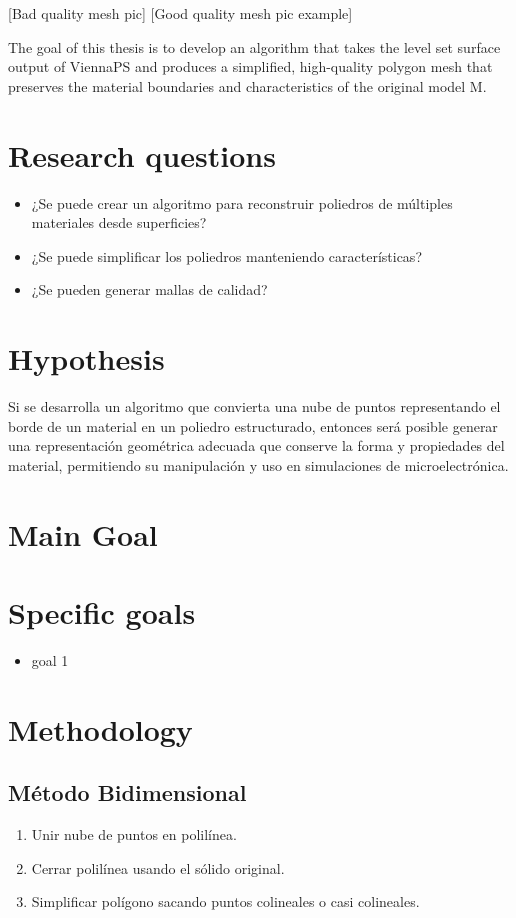 \documentclass[submission]{eptcs}
\begin{document}
[Bad quality mesh pic]
[Good quality mesh pic example]

The goal of this thesis is to develop an algorithm that takes the level set surface output of ViennaPS and produces a simplified, high-quality polygon mesh that preserves the material boundaries and characteristics of the original model M.
\section{Research questions}

\begin{itemize}
    \item ¿Se puede crear un algoritmo para reconstruir poliedros de múltiples materiales desde superficies?
    \item ¿Se puede simplificar los poliedros manteniendo características?
    \item ¿Se pueden generar mallas de calidad?
\end{itemize}


\section{Hypothesis}

Si se desarrolla un algoritmo que convierta una nube de puntos representando el borde de un material en un poliedro estructurado, entonces será posible generar una representación geométrica adecuada que conserve la forma y propiedades del material, permitiendo su manipulación y uso en simulaciones de microelectrónica.

\section{Main Goal}


\section{Specific goals}

\begin{itemize}
\item goal 1
\end{itemize}

\section{Methodology}

\subsection{Método Bidimensional}
\begin{enumerate}
    \item Unir nube de puntos en polilínea.
    \item Cerrar polilínea usando el sólido original.
    \item Simplificar polígono sacando puntos colineales o casi colineales.
\end{enumerate}
\end{document}
